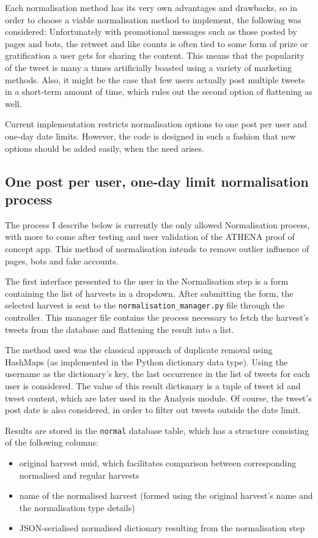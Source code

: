 Each normalisation method has its very own advantages and drawbacks, so in order to choose a viable normalisation method to implement, the following was considered: Unfortunately with promotional messages such as those posted by pages and bots, the retweet and like counts is often tied to some form of prize or gratification a user gets for sharing the content. This means that the popularity of the tweet is many a times artificially boasted using a variety of marketing methods. Also, it might be the case that few users actually post multiple tweets in a short-term amount of time, which rules out the second option of flattening as well.

Current implementation restricts normalisation options to one post per user and one-day date limits. However, the code is designed in such a fashion that new options should be added easily, when the need arises.

\subsection{One post per user, one-day limit normalisation process}
The process I describe below is currently the only allowed Normalisation process, with more to come after testing and user validation of the ATHENA proof of concept app. This method of normalisation intends to remove outlier influence of pages, bots and fake accounts.

The first interface presented to the user in the Normalisation step is a form containing the list of harvests in a dropdown. After submitting the form, the selected harvest is sent to the \texttt{normalisation\_manager.py} file through the controller. This manager file contains the process necessary to fetch the harvest's tweets from the database and flattening the result into a list.

The method used was the classical approach of duplicate removal using HashMaps (as implemented in the Python dictionary data type). Using the username as the dictionary's key, the last occurrence in the list of tweets for each user is considered. The value of this result dictionary is a tuple of tweet id and tweet content, which are later used in the Analysis module. Of course, the tweet's post date is also considered, in order to filter out tweets outside the date limit.

Results are stored in the \texttt{normal} database table, which has a structure consisting of the following columns:
\begin{itemize}
\item original harvest uuid, which facilitates comparison between corresponding normalised and regular harvests
\item name of the normalised harvest (formed using the original harvest's name and the normalisation type details)
\item JSON-serialised normalised dictionary resulting from the normalisation step
\end{itemize}

